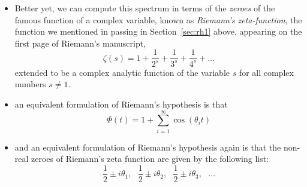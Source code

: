 \documentclass[11pt,draft]{article}
\theoremstyle{plain}
\theoremstyle{definition}
\numberwithin{equation}{section}
\numberwithin{figure}{section}
\numberwithin{table}{section}
\begin{document}
\begin{itemize}
$14.134725141734693790457251983562470270784257115699243175685567460149\newline
9634298092567649490103931715610127792029715487974367661426914698822545\newline
8250536323944713778041338123720597054962195586586020055556672583601077\newline
3700205410982661507542780517442591306254481978651072304938725629738321\newline
5774203952157256748093321400349904680343462673144209203773854871413783\newline
1735639699536542811307968053149168852906782082298049264338666734623320\newline
0787587617920056048680543568014444246510655975686659032286865105448594\newline
4432062407272703209427452221304874872092412385141835146054279015244783\newline
3835425453344004487936806761697300819000731393854983736215013045167269\newline
6838920039176285123212854220523969133425832275335164060169763527563758\newline
9695376749203361272092599917304270756830879511844534891800863008264831\newline
2516911271068291052375961797743181517071354531677549515382893784903647\newline
4709727019948485532209253574357909226125247736595518016975233461213977\newline
3160053541259267474557258778014726098308089786007125320875093959979666\newline
60675378381214891908864977277554420656532052405$

\vskip20pt
\noindent and if, by any chance, you wish to peruse the first
$100,\!000$ of these $\theta_i$'s lovingly calculated to an accuracy
within $3\cdot 10^{-9}$, consult Andrew Odlyzko's tables:
\url{http://www.dtc.umn.edu/~odlyzko/zeta_tables}

\item Better yet, we can compute this spectrum in terms of the {\it
    zeroes} of the famous function of a complex variable, known as
  {\it Riemann's zeta-function}, the function we mentioned in passing
  in Section~\ref{sec:rh1} above, appearing on the first page of
  Riemann's manuscript,
  $$
   \zeta(s) = 1 +{\frac{1}{2^s}} +{\frac{1}{3^s}}+{\frac{1}{4^s}}+\dots
  $$
  extended to be a complex analytic function of the variable $s$ for
  all complex numbers $s\ne 1$.

\item an equivalent formulation of Riemann's hypothesis is
  that 
  $$
   \Phi(t) = 1 + \sum_{i=1}^{\infty} \cos(\theta_i t)
  $$ 

 \vskip20pt
 
 \item and an equivalent formulation of Riemann's hypothesis again is
  that the non-real zeroes of Riemann's zeta function are given by the
  following list:
  $${\frac{1}{2}}\pm i\theta_1,\ \ \  
       {\frac{1}{2}}\pm  i\theta_2,\ \ \ 
       {\frac{1}{2}}\pm  i\theta_3,\ \ \  \dots
  $$
\end{itemize}
 
\end{document}
